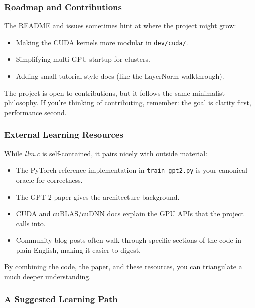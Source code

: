 \documentclass[
  letterpaper,
  DIV=11,
  numbers=noendperiod]{scrreprt}
\providecommand{\tightlist}{%
  \setlength{\itemsep}{0pt}\setlength{\parskip}{0pt}}
\begin{document}
\subsubsection{Roadmap and
Contributions}\label{roadmap-and-contributions}

The README and issues sometimes hint at where the project might grow:

\begin{itemize}
\tightlist
\item
  Making the CUDA kernels more modular in \texttt{dev/cuda/}.
\item
  Simplifying multi-GPU startup for clusters.
\item
  Adding small tutorial-style docs (like the LayerNorm walkthrough).
\end{itemize}

The project is open to contributions, but it follows the same minimalist
philosophy. If you're thinking of contributing, remember: the goal is
clarity first, performance second.

\subsubsection{External Learning
Resources}\label{external-learning-resources}

While \emph{llm.c} is self-contained, it pairs nicely with outside
material:

\begin{itemize}
\tightlist
\item
  The PyTorch reference implementation in \texttt{train\_gpt2.py} is
  your canonical oracle for correctness.
\item
  The GPT-2 paper gives the architecture background.
\item
  CUDA and cuBLAS/cuDNN docs explain the GPU APIs that the project calls
  into.
\item
  Community blog posts often walk through specific sections of the code
  in plain English, making it easier to digest.
\end{itemize}

By combining the code, the paper, and these resources, you can
triangulate a much deeper understanding.

\subsubsection{A Suggested Learning
Path}\label{a-suggested-learning-path}
\end{document}
